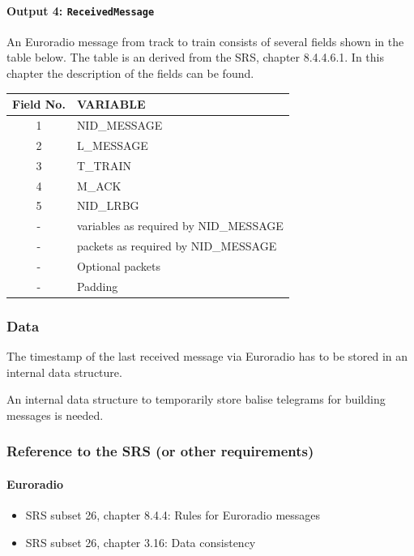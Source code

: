 \documentclass{template/openetcs_report}
\begin{document}
\paragraph{Output 4: \texttt{ReceivedMessage}}
An Euroradio message from track to train consists of several fields shown in the table below. The table is an derived from the SRS, chapter 8.4.4.6.1. In this chapter the description of the fields can be found.

  \begin{tabular}{| c | l |}
  \hline
  \textbf{Field No.} & \textbf{VARIABLE}\\ \hline
  1 & NID\_MESSAGE\\
  2 & L\_MESSAGE\\
  3 & T\_TRAIN\\
  4 & M\_ACK\\
  5 & NID\_LRBG\\
  - & variables as required by NID\_MESSAGE\\
  - & packets as required by NID\_MESSAGE\\
  - & Optional packets\\
  - & Padding\\
  
  \hline
\end{tabular}


\subsubsection{Data}
The timestamp of the last received message via Euroradio has to be stored in an internal data structure.

An internal data structure to temporarily store balise telegrams for building messages is needed.

\subsubsection{Reference to the SRS (or other requirements)}

\paragraph{Euroradio}
\begin{itemize}
 \item SRS subset 26, chapter 8.4.4: Rules for Euroradio messages
 \item SRS subset 26, chapter 3.16: Data consistency
\end{itemize}
\end{document}
